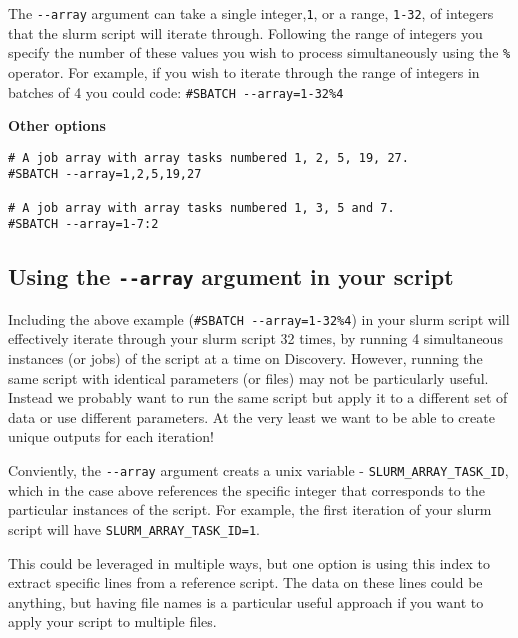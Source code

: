\documentclass[
  letterpaper,
  DIV=11,
  numbers=noendperiod]{scrreprt}
\begin{document}
The \texttt{-\/-array} argument can take a single integer,\texttt{1}, or
a range, \texttt{1-32}, of integers that the slurm script will iterate
through. Following the range of integers you specify the number of these
values you wish to process simultaneously using the \texttt{\%}
operator. For example, if you wish to iterate through the range of
integers in batches of 4 you could code:
\texttt{\#SBATCH\ -\/-array=1-32\%4}

\textbf{Other options}

\begin{verbatim}
# A job array with array tasks numbered 1, 2, 5, 19, 27.
#SBATCH --array=1,2,5,19,27

# A job array with array tasks numbered 1, 3, 5 and 7.
#SBATCH --array=1-7:2
\end{verbatim}

\hypertarget{using-the---array-argument-in-your-script}{%
\subsection*{\texorpdfstring{\textbf{Using the \texttt{-\/-array}
argument in your
script}}{Using the -\/-array argument in your script}}\label{using-the---array-argument-in-your-script}}

Including the above example (\texttt{\#SBATCH\ -\/-array=1-32\%4}) in
your slurm script will effectively iterate through your slurm script 32
times, by running 4 simultaneous instances (or jobs) of the script at a
time on Discovery. However, running the same script with identical
parameters (or files) may not be particularly useful. Instead we
probably want to run the same script but apply it to a different set of
data or use different parameters. At the very least we want to be able
to create unique outputs for each iteration!

Conviently, the \texttt{-\/-array} argument creats a unix variable -
\texttt{SLURM\_ARRAY\_TASK\_ID}, which in the case above references the
specific integer that corresponds to the particular instances of the
script. For example, the first iteration of your slurm script will have
\texttt{SLURM\_ARRAY\_TASK\_ID=1}.

This could be leveraged in multiple ways, but one option is using this
index to extract specific lines from a reference script. The data on
these lines could be anything, but having file names is a particular
useful approach if you want to apply your script to multiple files.
\end{document}
